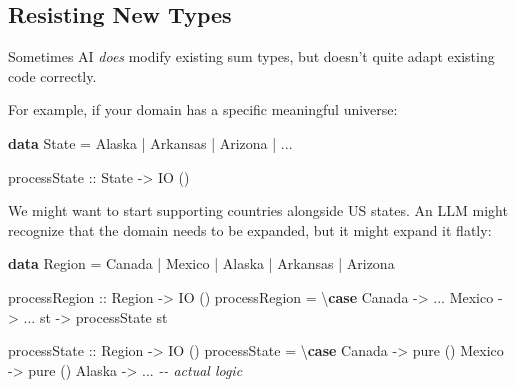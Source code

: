 \documentclass[]{article}
\newenvironment{Shaded}{}{}
\newcommand{\CommentTok}[1]{\textcolor[rgb]{0.38,0.63,0.69}{\textit{#1}}}
\newcommand{\DataTypeTok}[1]{\textcolor[rgb]{0.56,0.13,0.00}{#1}}
\newcommand{\FunctionTok}[1]{\textcolor[rgb]{0.02,0.16,0.49}{#1}}
\newcommand{\KeywordTok}[1]{\textcolor[rgb]{0.00,0.44,0.13}{\textbf{#1}}}
\newcommand{\NormalTok}[1]{#1}
\newcommand{\OperatorTok}[1]{\textcolor[rgb]{0.40,0.40,0.40}{#1}}
\newcommand{\OtherTok}[1]{\textcolor[rgb]{0.00,0.44,0.13}{#1}}
\begin{document}
\subsection{Resisting New Types}\label{resisting-new-types}

Sometimes AI \emph{does} modify existing sum types, but doesn't quite adapt
existing code correctly.

For example, if your domain has a specific meaningful universe:

\begin{Shaded}
\begin{Highlighting}[]
\KeywordTok{data} \DataTypeTok{State} \OtherTok{=} \DataTypeTok{Alaska} \OperatorTok{|} \DataTypeTok{Arkansas} \OperatorTok{|} \DataTypeTok{Arizona} \OperatorTok{|} \OperatorTok{...}

\OtherTok{processState ::} \DataTypeTok{State} \OtherTok{{-}\textgreater{}} \DataTypeTok{IO}\NormalTok{ ()}
\end{Highlighting}
\end{Shaded}

We might want to start supporting countries alongside US states. An LLM might
recognize that the domain needs to be expanded, but it might expand it flatly:

\begin{Shaded}
\begin{Highlighting}[]
\KeywordTok{data} \DataTypeTok{Region} \OtherTok{=} \DataTypeTok{Canada} \OperatorTok{|} \DataTypeTok{Mexico} \OperatorTok{|} \DataTypeTok{Alaska} \OperatorTok{|} \DataTypeTok{Arkansas} \OperatorTok{|} \DataTypeTok{Arizona}

\OtherTok{processRegion ::} \DataTypeTok{Region} \OtherTok{{-}\textgreater{}} \DataTypeTok{IO}\NormalTok{ ()}
\NormalTok{processRegion }\OtherTok{=}\NormalTok{ \textbackslash{}}\KeywordTok{case}
    \DataTypeTok{Canada} \OtherTok{{-}\textgreater{}} \OperatorTok{...}
    \DataTypeTok{Mexico} \OtherTok{{-}\textgreater{}} \OperatorTok{...}
\NormalTok{    st }\OtherTok{{-}\textgreater{}}\NormalTok{ processState st}

\OtherTok{processState ::} \DataTypeTok{Region} \OtherTok{{-}\textgreater{}} \DataTypeTok{IO}\NormalTok{ ()}
\NormalTok{processState }\OtherTok{=}\NormalTok{ \textbackslash{}}\KeywordTok{case}
    \DataTypeTok{Canada} \OtherTok{{-}\textgreater{}} \FunctionTok{pure}\NormalTok{ ()}
    \DataTypeTok{Mexico} \OtherTok{{-}\textgreater{}} \FunctionTok{pure}\NormalTok{ ()}
    \DataTypeTok{Alaska} \OtherTok{{-}\textgreater{}} \OperatorTok{...} \CommentTok{{-}{-} actual logic}
\end{Highlighting}
\end{Shaded}
\end{document}
